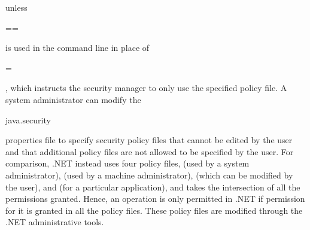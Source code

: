 unless \begin{code}==\end{code} is used in the command line in place of
\begin{code}=\end{code}, which instructs the security manager to only use the
specified policy file.
A system administrator can modify the \begin{code}java.security\end{code} properties file
to specify security policy files that cannot be edited by the user and that additional
policy files are not allowed to be specified by the user.
For comparison, .NET instead uses four policy files, 
(used by a system administrator),  (used by a machine administrator),
 (which can be modified by the user), and 
(for a particular application), and takes the intersection of all the permissions
granted. Hence, an operation is only permitted in .NET if permission for it is granted
in all the policy files. These policy files are modified through the .NET administrative tools.

